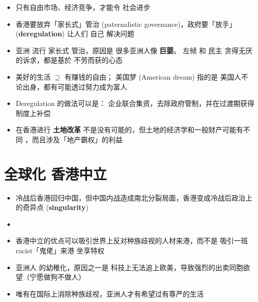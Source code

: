\begin{itemize}
	\item 只有自由市场、经济竞争，才能令 社会进步
	\item 香港要放弃「家长式」管治 (paternalistic governance)，政府要「放手」(\textbf{deregulation}) 让人们 自己 解决问题
	\item 亚洲 流行 家长式 管治，原因是 很多亚洲人像 \textbf{巨婴}。 左倾 和 民主 贪得无厌的诉求，都是基於 不劳而获的心态
	\item 美好的生活 $\supseteq$ 有赚钱的自由； 美国梦 (American dream) 指的是 美国人不论出身，都有可能透过努力成为富人
	\item Deregulation 的做法可以是： 企业联合集资，去除政府管制，并在过渡期获得制度上补偿
	\item 在香港进行 \textbf{土地改革} 不是没有可能的，但土地的经济学和一般财产可能有不同 \cite{Ryan-Collins2017} \cite{Farvacque-Vitkoviac1992} \cite{Blomley2004} \cite{Linklater2013} \cite{Adams2015}，而且涉及「地产霸权」的利益
\end{itemize}

\section{全球化 \textbullet 香港中立}

\begin{itemize}
	\item 冷战后香港回归中国，但中国内战造成南北分裂局面，香港变成冷战后政治上的奇异点 (\textbf{singularity})
	\item 
	\item 香港中立的优点可以吸引世界上反对种族歧视的人材来港，而不是 吸引一班 racist「鬼佬」来港 坐享特权
	\item 亚洲人 的幼稚化，原因之一是 科技上无法追上欧美，导致强烈的出卖同胞欲望（宁愿做狗不做人）
	\item 唯有在国际上消除种族歧视，亚洲人才有希望过有尊严的生活
\end{itemize}

\printbibliography

